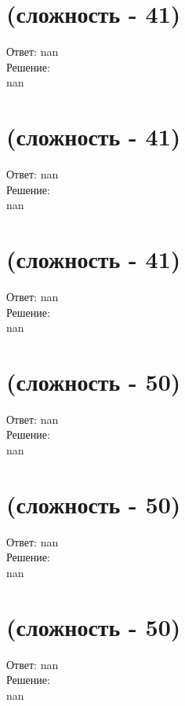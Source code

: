 \documentclass[a4paper,11pt]{article}%
\begin{document}
%
\section{(сложность {-} 41)}%
\label{sec:( {-} 41)}%
\hspace{3ex} Ответ: nan \\%
%
\hspace*{3ex} Решение: \\%
nan

%
\section{(сложность {-} 41)}%
\label{sec:( {-} 41)}%
\hspace{3ex} Ответ: nan \\%
%
\hspace*{3ex} Решение: \\%
nan

%
\section{(сложность {-} 41)}%
\label{sec:( {-} 41)}%
\hspace{3ex} Ответ: nan \\%
%
\hspace*{3ex} Решение: \\%
nan

%
\section{(сложность {-} 50)}%
\label{sec:( {-} 50)}%
\hspace{3ex} Ответ: nan \\%
%
\hspace*{3ex} Решение: \\%
nan

%
\section{(сложность {-} 50)}%
\label{sec:( {-} 50)}%
\hspace{3ex} Ответ: nan \\%
%
\hspace*{3ex} Решение: \\%
nan

%
\section{(сложность {-} 50)}%
\label{sec:( {-} 50)}%
\hspace{3ex} Ответ: nan \\%
%
\hspace*{3ex} Решение: \\%
nan
\end{document}
